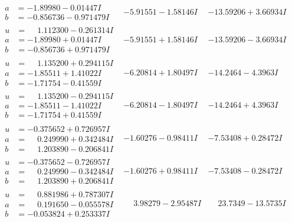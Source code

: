 \documentclass[1p]{elsarticle_modified}
\theoremstyle{definition}
\begin{document}
$$\begin{array}{c|c|c}
\begin{aligned}
a &= -1.89980 - 0.01447 I \\
b &= -0.856736 - 0.971479 I\end{aligned}
 & -5.91551 - 1.58146 I & -13.59206 + 3.66934 I \\ \hline\begin{aligned}
u &= \phantom{-}1.112300 - 0.261314 I \\
a &= -1.89980 + 0.01447 I \\
b &= -0.856736 + 0.971479 I\end{aligned}
 & -5.91551 + 1.58146 I & -13.59206 - 3.66934 I \\ \hline\begin{aligned}
u &= \phantom{-}1.135200 + 0.294115 I \\
a &= -1.85511 + 1.41022 I \\
b &= -1.71754 - 0.41559 I\end{aligned}
 & -6.20814 + 1.80497 I & -14.2464 - 4.3963 I \\ \hline\begin{aligned}
u &= \phantom{-}1.135200 - 0.294115 I \\
a &= -1.85511 - 1.41022 I \\
b &= -1.71754 + 0.41559 I\end{aligned}
 & -6.20814 - 1.80497 I & -14.2464 + 4.3963 I \\ \hline\begin{aligned}
u &= -0.375652 + 0.726957 I \\
a &= \phantom{-}0.249990 + 0.342484 I \\
b &= \phantom{-}1.203890 - 0.206841 I\end{aligned}
 & -1.60276 - 0.98411 I & -7.53408 + 0.28472 I \\ \hline\begin{aligned}
u &= -0.375652 - 0.726957 I \\
a &= \phantom{-}0.249990 - 0.342484 I \\
b &= \phantom{-}1.203890 + 0.206841 I\end{aligned}
 & -1.60276 + 0.98411 I & -7.53408 - 0.28472 I \\ \hline\begin{aligned}
u &= \phantom{-}0.881986 + 0.787307 I \\
a &= \phantom{-}0.191650 - 0.055578 I \\
b &= -0.053824 + 0.253337 I\end{aligned}
 & \phantom{-}3.98279 - 2.95487 I & \phantom{-}23.7349 - 13.5735 I \\ \hline\begin{aligned}

\end{aligned}
\end{array}$$
\end{document}
